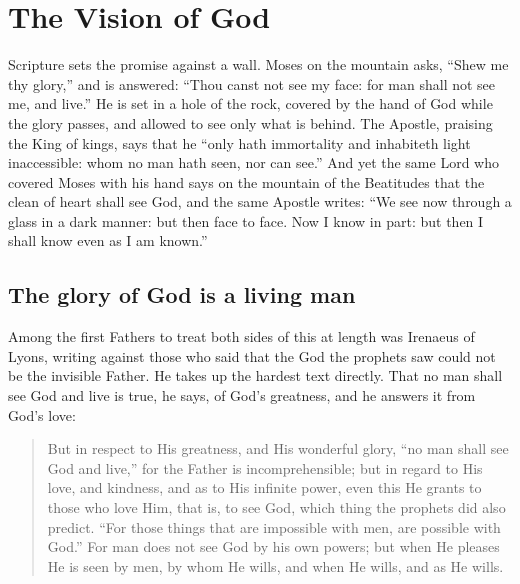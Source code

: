 \section{The Vision of God}

Scripture sets the promise against a wall. Moses on the mountain asks, ``Shew me thy glory,'' and is answered: ``Thou canst not see my face: for man shall not see me, and live.'' He is set in a hole of the rock, covered by the hand of God while the glory passes, and allowed to see only what is behind. The Apostle, praising the King of kings, says that he ``only hath immortality and inhabiteth light inaccessible: whom no man hath seen, nor can see.'' And yet the same Lord who covered Moses with his hand says on the mountain of the Beatitudes that the clean of heart shall see God, and the same Apostle writes: ``We see now through a glass in a dark manner: but then face to face. Now I know in part: but then I shall know even as I am known.''

\subsection{The glory of God is a living man}

Among the first Fathers to treat both sides of this at length was Irenaeus of Lyons, writing against those who said that the God the prophets saw could not be the invisible Father. He takes up the hardest text directly. That no man shall see God and live is true, he says, of God's greatness, and he answers it from God's love:

\begin{quote}
But in respect to His greatness, and His wonderful glory, ``no man shall see God and live,'' for the Father is incomprehensible; but in regard to His love, and kindness, and as to His infinite power, even this He grants to those who love Him, that is, to see God, which thing the prophets did also predict. ``For those things that are impossible with men, are possible with God.'' For man does not see God by his own powers; but when He pleases He is seen by men, by whom He wills, and when He wills, and as He wills.
\end{quote}

